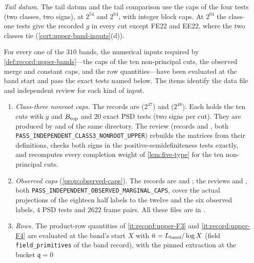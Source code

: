 \emph{Tail datum.} The tail datum and the tail comparison use the caps of the four
tests (two classes, two signs), at $2^{54}$ and $2^{64}$, with integer block caps.
At $2^{64}$ the class-one tests give the recorded $g$ in every cut except FE22 and
EE22, where the two classes tie (\cref{cert:upper-band-inputs}(d)).

\begin{certificate}\label{cert:upper-band-inputs}
\sloppy
For every one of the $310$ bands, the numerical inputs required
by \cref{def:record:upper-bands}---the caps of the ten
non-principal cuts, the observed merge and constant caps, and the
row quantities---have been evaluated at the band start and pass
the exact tests named below. The items identify the data file
and independent review for each kind of input.
\begin{enumerate}[label=(\alph*)]
\item \emph{Class-three nonroot caps.} The records are
  ($2^{47}$) and
  ($2^{48}$). Each
 holds the ten cuts with $g$ and $B_{\rm top}$ and $20$ exact PSD tests (two signs
 per cut). They are produced by  and
  of the same directory. The review
  (records  and
 , both
 \texttt{PASS\_INDEPENDENT\_CLASS3\_NONROOT\_UPPER}) rebuilds the matrices from their definitions, checks both signs in the positive-semidefiniteness tests exactly, and recomputes every completion weight of \cref{lem:five-type} for the ten non-principal cuts.
\item \emph{Observed caps} (\cref{prop:observed-caps}). The records are
  and ; the reviews
  and , both
 \texttt{PASS\_INDEPENDENT\_OBSERVED\_MARGINAL\_CAPS}, cover the actual
 projections of the eighteen half labels to the twelve and the six observed
 labels, $4$ PSD tests and $2622$ frame pairs. All these files are in
 .
\item \emph{Rows.} The product-row quantities of \ref{it:record:upper-F3} and
 \ref{it:record:upper-F4} are evaluated at the band's start $X$ with
 $\bar n=L_{\rm band}/\log X$ (field \texttt{field\_primitives} of the band
 record), with the pinned extraction at the bucket $\mathfrak q=0$

\end{enumerate}
\end{certificate}
